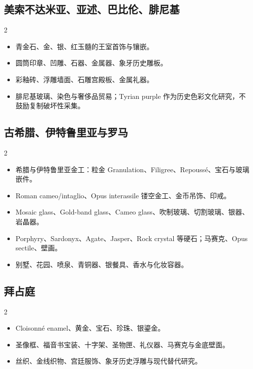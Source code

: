 \documentclass[lang=en,a4paper,11pt]{elegantpaper}
\begin{document}
\subsection{美索不达米亚、亚述、巴比伦、腓尼基}


\begin{multicols}{2}
\begin{itemize}
\item 青金石、金、银、红玉髓的王室首饰与镶嵌。
\item 圆筒印章、凹雕、石器、金属器、象牙历史雕板。
\item 彩釉砖、浮雕墙面、石雕宫殿板、金属礼器。
\item 腓尼基玻璃、染色与奢侈品贸易；Tyrian purple 作为历史色彩文化研究，不鼓励复制破坏性采集。
\end{itemize}
\end{multicols}

\subsection{古希腊、伊特鲁里亚与罗马}


\begin{multicols}{2}
\begin{itemize}
\item 希腊与伊特鲁里亚金工：粒金 Granulation、Filigree、Repoussé、宝石与玻璃嵌件。
\item Roman cameo/intaglio、Opus interassile 镂空金工、金币吊饰、印戒。
\item Mosaic glass、Gold-band glass、Cameo glass、吹制玻璃、切割玻璃、银器、岩晶器。
\item Porphyry、Sardonyx、Agate、Jasper、Rock crystal 等硬石；马赛克、Opus sectile、壁画。
\item 别墅、花园、喷泉、青铜器、银餐具、香水与化妆容器。
\end{itemize}
\end{multicols}

\subsection{拜占庭}


\begin{multicols}{2}
\begin{itemize}
\item Cloisonné enamel、黄金、宝石、珍珠、银鎏金。
\item 圣像框、福音书宝装、十字架、圣物匣、礼仪器、马赛克与金底壁面。
\item 丝织、金线织物、宫廷服饰、象牙历史浮雕与现代替代研究。
\end{itemize}
\end{multicols}
\end{document}
